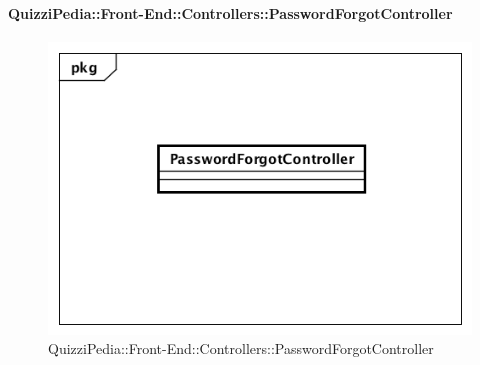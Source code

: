 \paragraph{QuizziPedia::Front-End::Controllers::PasswordForgotController}
\begin{figure} [ht]
	\centering
	\includegraphics[scale=0.45]{UML/Classi/Front-End/QuizziPedia_Front-end_Controller_PasswordForgotController.png}
	\caption{QuizziPedia::Front-End::Controllers::PasswordForgotController}
\end{figure} \FloatBarrier
